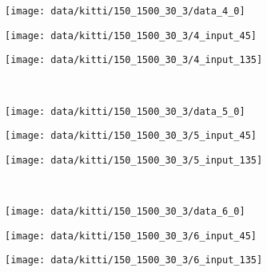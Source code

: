 \begin{figure}[h]
  \begin{subfigure}[t]{0.425\textwidth}
    \vspace{12px}
    \texttt{[image: data/kitti/150\_1500\_30\_3/data\_4\_0]}
  \end{subfigure}
  \begin{subfigure}[t]{0.2\textwidth}
    \vspace{0px}
    \texttt{[image: data/kitti/150\_1500\_30\_3/4\_input\_45]}
  \end{subfigure}
  \begin{subfigure}[t]{0.2\textwidth}
    \vspace{0px}
    \texttt{[image: data/kitti/150\_1500\_30\_3/4\_input\_135]}
  \end{subfigure}\\
  \begin{subfigure}[t]{0.425\textwidth}
    \vspace{12px}
    \texttt{[image: data/kitti/150\_1500\_30\_3/data\_5\_0]}
  \end{subfigure}
  \begin{subfigure}[t]{0.2\textwidth}
    \vspace{0px}
    \texttt{[image: data/kitti/150\_1500\_30\_3/5\_input\_45]}
  \end{subfigure}
  \begin{subfigure}[t]{0.2\textwidth}
    \vspace{0px}
    \texttt{[image: data/kitti/150\_1500\_30\_3/5\_input\_135]}
  \end{subfigure}\\
  \begin{subfigure}[t]{0.425\textwidth}
    \vspace{12px}
    \texttt{[image: data/kitti/150\_1500\_30\_3/data\_6\_0]}
  \end{subfigure}
  \begin{subfigure}[t]{0.2\textwidth}
    \vspace{0px}
    \texttt{[image: data/kitti/150\_1500\_30\_3/6\_input\_45]}
  \end{subfigure}
  \begin{subfigure}[t]{0.2\textwidth}
    \vspace{0px}
    \texttt{[image: data/kitti/150\_1500\_30\_3/6\_input\_135]}

\end{subfigure}
\end{figure}
